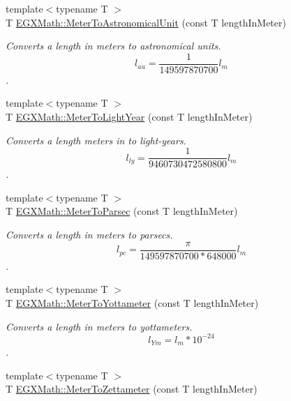 \begin{DoxyCompactItemize}
\item 
{\footnotesize template$<$typename T $>$ }\\T \mbox{\hyperlink{group___e_g_x_math-_conversions-_length_conversions-_s_i-_meter-_astronomical_gadf1e5c63bba613fab5b94704df71994d}{E\+G\+X\+Math\+::\+Meter\+To\+Astronomical\+Unit}} (const T length\+In\+Meter)
\begin{DoxyCompactList}\small\item\em Converts a length in meters to astronomical units. \[ l_{au}= \frac{1}{149597870700} l_{m} \]. \end{DoxyCompactList}\item 
{\footnotesize template$<$typename T $>$ }\\T \mbox{\hyperlink{group___e_g_x_math-_conversions-_length_conversions-_s_i-_meter-_astronomical_ga0dbb6d8e5d002475c0335934326b27d7}{E\+G\+X\+Math\+::\+Meter\+To\+Light\+Year}} (const T length\+In\+Meter)
\begin{DoxyCompactList}\small\item\em Converts a length meters in to light-\/years. \[ l_{ly}= \frac{1}{9460730472580800} l_{m} \]. \end{DoxyCompactList}\item 
{\footnotesize template$<$typename T $>$ }\\T \mbox{\hyperlink{group___e_g_x_math-_conversions-_length_conversions-_s_i-_meter-_astronomical_ga326ca8b69fece7b50052e3f319d5ce5a}{E\+G\+X\+Math\+::\+Meter\+To\+Parsec}} (const T length\+In\+Meter)
\begin{DoxyCompactList}\small\item\em Converts a length in meters to parsecs. \[ l_{pc}=\frac{\pi}{149597870700 * 648000} l_{m} \]. \end{DoxyCompactList}\item 
{\footnotesize template$<$typename T $>$ }\\T \mbox{\hyperlink{group___e_g_x_math-_conversions-_length_conversions-_s_i-_meter-_s_i_ga53fdb093b4572363a0ae9be4ced2ecb4}{E\+G\+X\+Math\+::\+Meter\+To\+Yottameter}} (const T length\+In\+Meter)
\begin{DoxyCompactList}\small\item\em Converts a length in meters to yottameters. \[ l_{Ym}=l_{m} * 10^{-24} \]. \end{DoxyCompactList}\item 
{\footnotesize template$<$typename T $>$ }\\T \mbox{\hyperlink{group___e_g_x_math-_conversions-_length_conversions-_s_i-_meter-_s_i_gafbd51e362ddfd28f270450693783f5c6}{E\+G\+X\+Math\+::\+Meter\+To\+Zettameter}} (const T length\+In\+Meter)

\end{DoxyCompactItemize}
